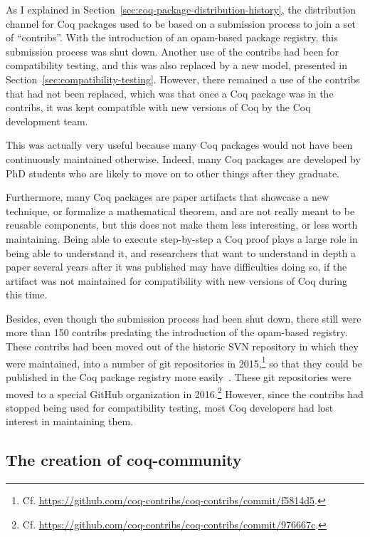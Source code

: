 As I explained in Section~\ref{sec:coq-package-distribution-history}, the distribution channel for Coq packages used to be based on a submission process to join a set of ``contribs''.
With the introduction of an opam-based package registry, this submission process was shut down.
Another use of the contribs had been for compatibility testing, and this was also replaced by a new model, presented in Section~\ref{sec:compatibility-testing}.
However, there remained a use of the contribs that had not been replaced, which was that once a Coq package was in the contribs, it was kept compatible with new versions of Coq by the Coq development team.

This was actually very useful because many Coq packages would not have been continuously maintained otherwise.
Indeed, many Coq packages are developed by PhD students who are likely to move on to other things after they graduate.

Furthermore, many Coq packages are paper artifacts that showcase a new technique, or formalize a mathematical theorem, and are not really meant to be reusable components, but this does not make them less interesting, or less worth maintaining.
Being able to execute step-by-step a Coq proof plays a large role in being able to understand it, and researchers that want to understand in depth a paper several years after it was published may have difficulties doing so, if the artifact was not maintained for compatibility with new versions of Coq during this time.

Besides, even though the submission process had been shut down, there still were more than 150 contribs predating the introduction of the opam-based registry.
These contribs had been moved out of the historic SVN repository in which they were maintained, into a number of git repositories in 2015,\footnote{
	Cf. \url{https://github.com/coq-contribs/coq-contribs/commit/f5814d5}.
} so that they could be published in the Coq package registry more easily~\cite{claret2015opam}.
These git repositories were moved to a special GitHub organization in 2016.\footnote{
	Cf. \url{https://github.com/coq-contribs/coq-contribs/commit/976667c}.
}
However, since the contribs had stopped being used for compatibility testing, most Coq developers had lost interest in maintaining them.

\subsection{The creation of coq-community}

